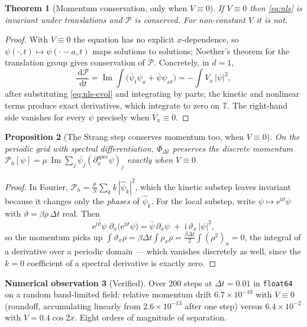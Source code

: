 \documentclass[11pt,a4paper]{article}
\theoremstyle{plain}
\newtheorem{theorem}{Theorem}[section]
\newtheorem{proposition}[theorem]{Proposition}
\theoremstyle{definition}
\newtheorem{observation}[theorem]{Numerical observation}
\theoremstyle{remark}
\newcommand{\T}{\mathbb{T}}
\newcommand{\iu}{\mathrm{i}}
\newcommand{\eu}{\mathrm{e}}
\newcommand{\dd}{\,\mathrm{d}}
\newcommand{\dt}{\Delta t}
\newcommand{\Flow}{\Phi}
\newcommand{\Mom}{\mathcal{P}}
\newcommand{\code}[1]{\texttt{\small #1}}
\DeclareMathOperator{\Imag}{Im}
\begin{document}
\begin{theorem}[Momentum conservation, only when $V\equiv 0$]
\label{thm:momentum}
If $V\equiv 0$ then \eqref{eq:nls} is invariant under translations and $\Mom$ is
conserved. For non-constant $V$ it is not.
\end{theorem}

\begin{proof}
With $V\equiv 0$ the equation has no explicit $x$-dependence, so
$\psi(\cdot,t)\mapsto\psi(\cdot-a,t)$ maps solutions to solutions; Noether's theorem for
the translation group gives conservation of $\Mom$. Concretely, in $d=1$,
\[
\frac{\dd\Mom}{\dd t}
= \Imag\int\bigl(\bar\psi_t\psi_x + \bar\psi\psi_{xt}\bigr)
= -\int V_x\,|\psi|^2 ,
\]
after substituting \eqref{eq:nls-evol} and integrating by parts; the kinetic and
nonlinear terms produce exact derivatives, which integrate to zero on $\T$. The right-hand
side vanishes for every $\psi$ precisely when $V_x\equiv 0$.
\end{proof}

\begin{proposition}[The Strang step conserves momentum too, when $V\equiv0$]
\label{prop:discretemomentum}
On the periodic grid with spectral differentiation, $\Flow_{\dt}$ preserves the discrete
momentum $\Mom_h[\psi] = \mu\,\Imag\sum_j\overline{\psi_j}(\partial_x^{\mathrm{spec}}\psi)_j$
exactly when $V\equiv0$.
\end{proposition}

\begin{proof}
In Fourier, $\Mom_h = \tfrac{\mu}{N}\sum_k k\,|\widehat\psi_k|^2$, which the kinetic
substep leaves invariant because it changes only the \emph{phases} of $\widehat\psi_k$.
For the local substep, write $\psi\mapsto \eu^{\iu\vartheta}\psi$ with
$\vartheta = \beta\rho\,\dt$ real. Then
\[
\overline{\eu^{\iu\vartheta}\psi}\;\partial_x\bigl(\eu^{\iu\vartheta}\psi\bigr)
= \bar\psi\,\partial_x\psi \;+\; \iu\,\vartheta_x\,|\psi|^2 ,
\]
so the momentum picks up
$\int \vartheta_x\rho = \beta\dt\int\rho_x\rho = \tfrac{\beta\dt}{2}\int(\rho^2)_x = 0$,
the integral of a derivative over a periodic domain --- which vanishes discretely as well,
since the $k=0$ coefficient of a spectral derivative is exactly zero.
\end{proof}

\begin{observation}[Verified]
Over 200 steps at $\dt=0.01$ in \code{float64} on a random band-limited field:
relative momentum drift $6.7\times10^{-10}$ with $V\equiv0$ (roundoff, accumulating
linearly from $2.6\times10^{-13}$ after one step) versus $6.4\times10^{-2}$ with
$V=0.4\cos 2x$. Eight orders of magnitude of separation.
\end{observation}
\end{document}
